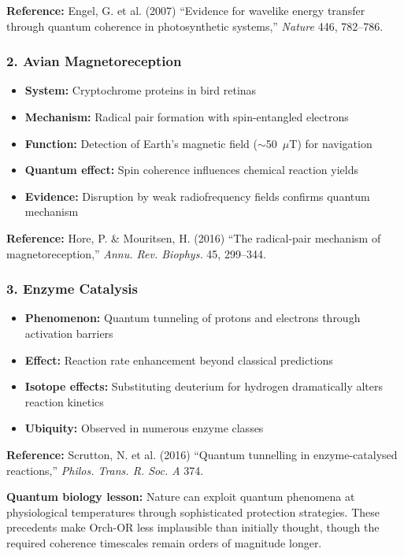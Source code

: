 \textbf{Reference:} Engel, G. et al. (2007) ``Evidence for wavelike energy transfer through quantum coherence in photosynthetic systems,'' \textit{Nature} 446, 782--786.

\subsubsection{2. Avian Magnetoreception}

\begin{itemize}
\item \textbf{System:} Cryptochrome proteins in bird retinas
\item \textbf{Mechanism:} Radical pair formation with spin-entangled electrons
\item \textbf{Function:} Detection of Earth's magnetic field ($\sim$50~$\mu$T) for navigation
\item \textbf{Quantum effect:} Spin coherence influences chemical reaction yields
\item \textbf{Evidence:} Disruption by weak radiofrequency fields confirms quantum mechanism
\end{itemize}

\textbf{Reference:} Hore, P. \& Mouritsen, H. (2016) ``The radical-pair mechanism of magnetoreception,'' \textit{Annu. Rev. Biophys.} 45, 299--344.

\subsubsection{3. Enzyme Catalysis}

\begin{itemize}
\item \textbf{Phenomenon:} Quantum tunneling of protons and electrons through activation barriers
\item \textbf{Effect:} Reaction rate enhancement beyond classical predictions
\item \textbf{Isotope effects:} Substituting deuterium for hydrogen dramatically alters reaction kinetics
\item \textbf{Ubiquity:} Observed in numerous enzyme classes
\end{itemize}

\textbf{Reference:} Scrutton, N. et al. (2016) ``Quantum tunnelling in enzyme-catalysed reactions,'' \textit{Philos. Trans. R. Soc. A} 374.

\begin{keyconcept}
\textbf{Quantum biology lesson:} Nature can exploit quantum phenomena at physiological temperatures through sophisticated protection strategies. These precedents make Orch-OR less implausible than initially thought, though the required coherence timescales remain orders of magnitude longer.
\end{keyconcept}


